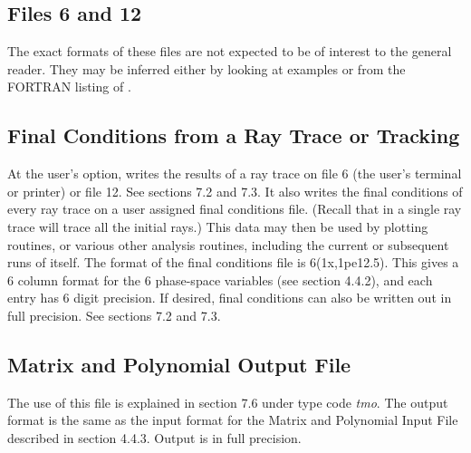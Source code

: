 \subsection{Files 6 and 12}
     The exact formats of these files are not expected to be of interest to
the general reader.  They may be inferred either by looking at examples or
from the FORTRAN listing of \Maryend.

\subsection{Final Conditions from a Ray Trace or Tracking}

     At the user's option, \Mary writes the results of a ray trace on
file 6 (the user's terminal or printer) or file 12.  See sections 7.2 and
7.3.  It also writes the final conditions of every ray trace on a user
assigned final conditions file.  (Recall that in a single ray trace \Mary
will trace all the initial rays.)  This data may then be used by plotting
routines, or various other analysis routines, including the current or
subsequent runs of \Mary itself.  The format of the final conditions file
is 6(1x,1pe12.5).  This gives a 6 column format for the 6 phase-space
variables (see section 4.4.2), and each entry has 6 digit precision.  If
desired, final conditions can also be written out in full precision.  See
sections 7.2 and 7.3.

\subsection{Matrix and Polynomial Output File}

     The use of this file is explained in section 7.6 under type code {\em tmo}.
The output format is the same as the input format for the Matrix and
Polynomial Input File described in section 4.4.3.  Output is in full
precision.

